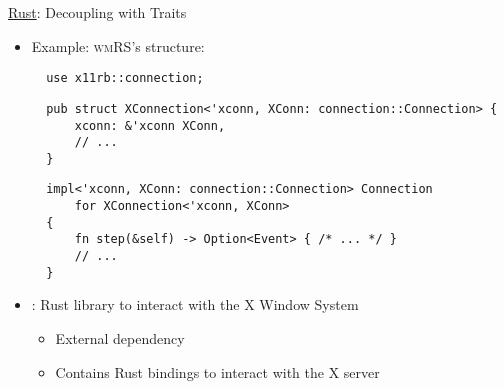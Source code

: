 \begin{frame}[fragile]{\underline{Rust}: Decoupling with Traits \hfill {\footnotesize \currentname}}


    \begin{itemize}

        \item Example: \textsc{wmRS}'s  structure:\\
\begin{verbatim}
  use x11rb::connection;
\end{verbatim}
\begin{verbatim}
  pub struct XConnection<'xconn, XConn: connection::Connection> {
      xconn: &'xconn XConn,
      // ...
  }
\end{verbatim}
\begin{verbatim}
  impl<'xconn, XConn: connection::Connection> Connection
      for XConnection<'xconn, XConn>
  {
      fn step(&self) -> Option<Event> { /* ... */ }
      // ...
  }
\end{verbatim}

        \item {}: Rust library to interact with the X Window System\\
            \begin{itemize}
                \item External dependency
                \item Contains Rust bindings to interact with the X server
            \end{itemize}

    \end{itemize}

    \vfill

\end{frame}

